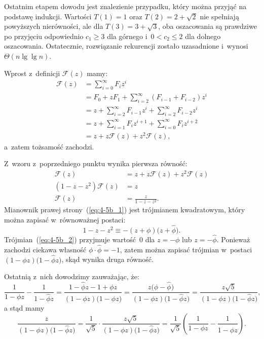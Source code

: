 Ostatnim etapem dowodu jest znalezienie przypadku, który można przyjąć na podstawę indukcji. Wartości $T(1)=1$ oraz $T(2)=2+\sqrt{2}$ nie spełniają powyższych nierówności, ale dla $T(3)=3+\sqrt{3}$, oba oszacowania są prawdziwe po przyjęciu odpowiednio $c_1\ge3$ dla górnego i~$0<c_2\le2$ dla dolnego oszacowania. Ostatecznie, rozwiązanie rekurencji zostało uzasadnione i~wynosi $\Theta(n\lg\lg n)$.


\subproblem %
Wprost z~definicji $\mathcal{F}(z)$ mamy:
\begin{align*}
	\mathcal{F}(z) &= \sum_{i=0}^\infty F_iz^i \\
	&= F_0+zF_1+\sum_{i=2}^\infty (F_{i-1}+F_{i-2})z^i \\
	&= z+\sum_{i=2}^\infty F_{i-1}z^i+\sum_{i=2}^\infty F_{i-2}z^i \\
	&= z+\sum_{i=1}^\infty F_iz^{i+1}+\sum_{i=0}^\infty F_iz^{i+2} \\[2mm]
	&= z+z\mathcal{F}(z)+z^2\mathcal{F}(z),
\end{align*}
a~zatem tożsamość zachodzi.

\subproblem %
Z~wzoru z~poprzedniego punktu wynika pierwsza równość:
\begin{align*}
	\mathcal{F}(z) &= z+z\mathcal{F}(z)+z^2\mathcal{F}(z) \\
	(1-z-z^2)\mathcal{F}(z) &= z \\
	\mathcal{F}(z) &= \frac{z}{1-z-z^2}. \tag{$*$}\label{eq:4-5b_1}
\end{align*}
Mianownik prawej strony~(\ref{eq:4-5b_1}) jest trójmianem kwadratowym, który można zapisać w~równoważnej postaci:
\[
	1-z-z^2 \equiv -(z+\phi)\bigl(z+\widehat\phi\bigr). \tag{$*$}\label{eq:4-5b_2}
\]
Trójmian~(\ref{eq:4-5b_2}) przyjmuje wartość~0 dla $z=-\phi$ lub $z=-\widehat\phi$. Ponieważ zachodzi ciekawa własność $\phi\cdot\widehat\phi=-1$, zatem można zapisać trójmian w~postaci $(1-\phi z)\bigl(1-\widehat\phi z\bigr)$, skąd wynika druga równość.

Ostatnią z~nich dowodzimy zauważając, że:
\[
	\frac{1}{1-\phi z}-\frac{1}{1-\widehat\phi z} = \frac{1-\widehat\phi z-1+\phi z}{(1-\phi z)\bigl(1-\widehat\phi z\bigr)} = \frac{z\bigl(\phi-\widehat\phi\bigr)}{(1-\phi z)\bigl(1-\widehat\phi z\bigr)} = \frac{z\sqrt{5}}{(1-\phi z)\bigl(1-\widehat\phi z\bigr)},
\]
a stąd mamy
\[
	\frac{z}{(1-\phi z)\bigl(1-\widehat\phi z\bigr)} = \frac{1}{\sqrt{5}}\cdot\frac{z\sqrt{5}}{(1-\phi z)\bigl(1-\widehat\phi z\bigr)} = \frac{1}{\sqrt{5}}\left(\frac{1}{1-\phi z}-\frac{1}{1-\widehat\phi z}\right).
\]

